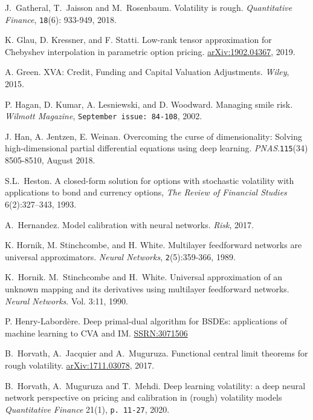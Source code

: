 \documentclass{article}
\theoremstyle{remark}
\begin{document}
\begin{thebibliography}{99}
J.~Gatheral, T.~Jaisson  and M.~Rosenbaum.
Volatility is rough.
\textit{Quantitative Finance}, {\tt 18}(6): 933-949, 2018.

K. Glau, D. Kressner, and F. Statti.
Low-rank tensor approximation for Chebyshev interpolation in parametric option pricing.
\href{https://arxiv.org/pdf/1902.04367.pdf}{arXiv:1902.04367}, 2019.

A. Green. XVA: Credit, Funding and Capital Valuation Adjustments. \textit{Wiley}, 2015.

P. Hagan, D. Kumar, A. Lesniewski, and D. Woodward. Managing smile risk. \textit{Wilmott Magazine}, {\tt September issue: 84-108}, 2002.

J. Han, A. Jentzen, E. Weinan.
Overcoming the curse of dimensionality: Solving high-dimensional partial differential equations using deep learning.
\textit{PNAS}.{\tt 115}(34) 8505-8510, August 2018.

S.L.~Heston. A closed-form solution for options with stochastic
  volatility with applications to bond and currency options, \textit{The Review of Financial Studies} 6(2):327--343, 1993.

A.~Hernandez. Model calibration with neural networks. \textit{Risk}, 2017.    

K. Hornik, M. Stinchcombe, and H. White. 
Multilayer feedforward networks are universal approximators. 
\textit{Neural Networks}, {\tt 2}(5):359-366, 1989.

K.~Hornik. M.~Stinchcombe and H.~White. Universal approximation of an unknown mapping and its derivatives using multilayer feedforward networks. \textit{Neural Networks}.
Vol. 3:11, 1990.

P. Henry-Labord\`{e}re.
Deep primal-dual algorithm for BSDEs: applications of machine learning to CVA and IM. 
\href{https://ssrn.com/abstract=3071506}{SSRN:3071506}

B.~Horvath, A.~Jacquier and A.~Muguruza.
Functional central limit theorems for rough volatility.
\href{https://arxiv.org/abs/1711.03078}{arXiv:1711.03078}, 2017.

B.~Horvath,  A.~Muguruza and T.~Mehdi.
Deep learning volatility: a deep neural network perspective on pricing and calibration in (rough) volatility models
\textit{Quantitative Finance} 21(1), {\tt p. 11-27}, 2020.


\end{thebibliography}
\end{document}
